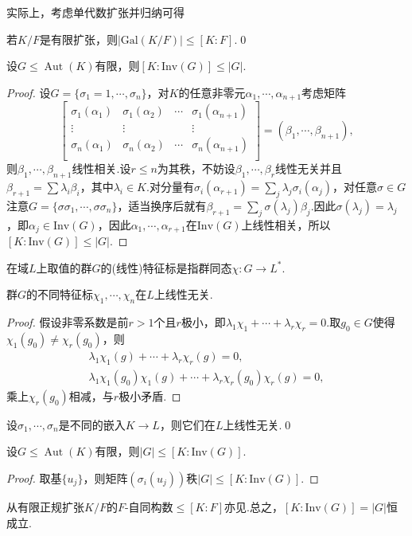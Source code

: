 实际上，考虑单代数扩张并归纳可得
\begin{lemma*}
    若$K/F$是有限扩张，则$|\mathrm{Gal}(K/F)|\le[K:F]$.\qed
\end{lemma*}
\begin{lemma*}[(Artin)]
    设$G\le\operatorname*{Aut}(K)$有限，则$[K:\mathrm{Inv}(G)]\le|G|$.
\end{lemma*}
\begin{proof}
    设$G=\{\sigma_1=1,\cdots,\sigma_n\}$，对$K$的任意非零元$\alpha_1,\cdots,\alpha_{n+1}$考虑矩阵
    \[
        \begin{bmatrix}
            \sigma_1(\alpha_1)&\sigma_1(\alpha_2)&\cdots&\sigma_1(\alpha_{n+1})\\
            \vdots&\vdots&&\vdots\\
            \sigma_n(\alpha_1)&\sigma_n(\alpha_2)&\cdots&\sigma_n(\alpha_{n+1})\\
        \end{bmatrix}=(\beta_1,\cdots,\beta_{n+1}),
    \]
    则$\beta_1,\cdots,\beta_{n+1}$线性相关.设$r\le n$为其秩，不妨设$\beta_1,\cdots,\beta_r$线性无关并且$\beta_{r+1}=\sum\lambda_i\beta_i$，其中$\lambda_i\in K$.对分量有$\sigma_i(\alpha_{r+1})=\sum_j\lambda_j\sigma_i(\alpha_j)$，对任意$\sigma\in G$注意$G=\{\sigma\sigma_1,\cdots,\sigma\sigma_n\}$，适当换序后就有$\beta_{r+1}=\sum_j\sigma(\lambda_j)\beta_j$.因此$\sigma(\lambda_j)=\lambda_j$，即$\alpha_j\in\mathrm{Inv}(G)$，因此$\alpha_1,\cdots,\alpha_{r+1}$在$\mathrm{Inv}(G)$上线性相关，所以$[K:\mathrm{Inv}(G)]\le|G|$.
\end{proof}

在域$L$上取值的群$G$的(线性){\heiti 特征标}是指群同态$\chi\colon G\to L^*$.
\begin{prop}
    群$G$的不同特征标$\chi_1,\cdots,\chi_n$在$L$上线性无关.
\end{prop}
\begin{proof}
    假设非零系数是前$r>1$个且$r$极小，即$\lambda_1\chi_1+\cdots+\lambda_r\chi_r=0$.取$g_0\in G$使得$\chi_1(g_0)\ne\chi_r(g_0)$，则
    \begin{gather*}
        \lambda_1\chi_1(g)+\cdots+\lambda_r\chi_r(g)=0,\\
        \lambda_1\chi_1(g_0)\chi_1(g)+\cdots+\lambda_r\chi_r(g_0)\chi_r(g)=0,
    \end{gather*}
    乘上$\chi_r(g_0)$相减，与$r$极小矛盾.
\end{proof}
\begin{cor*}
    设$\sigma_1,\cdots,\sigma_n$是不同的嵌入$K\to L$，则它们在$L$上线性无关.\qed
\end{cor*}
\begin{cor*}
    设$G\le\operatorname*{Aut}(K)$有限，则$|G|\le[K:\mathrm{Inv}(G)]$.
\end{cor*}
\begin{proof}
    取基$\{u_j\}$，则矩阵$(\sigma_i(u_j))$秩$|G|\le[K:\mathrm{Inv}(G)]$.
\end{proof}
\begin{remark}
    从有限正规扩张$K/F$的$F$-自同构数$\le[K:F]$亦见.总之，$[K:\mathrm{Inv}(G)]=|G|$恒成立.
\end{remark}

